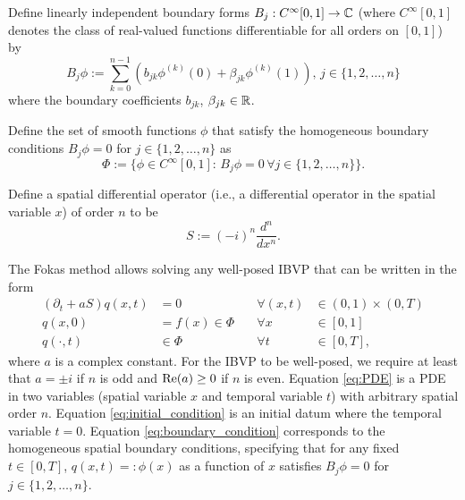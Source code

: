 \documentclass[12pt, oneside, a4paper]{article}
\begin{document}
Define linearly independent boundary forms $B_j: C^\infty[0,1]\to \mathbb C$ (where $C^\infty[0,1]$ denotes the class of real-valued functions differentiable for all orders on $[0,1]$) by
\begin{equation}\label{eq:B_j}
    B_j\phi := \sum_{k=0}^{n-1}\left(b_{jk}\phi^{(k)}(0) + \beta_{jk}\phi^{(k)}(1)\right),\, j\in\{1,2,\ldots,n\}
\end{equation}
where the boundary coefficients $b_{jk}$, $\beta_{jk}\in\mathbb R$. 

Define the set of smooth functions $\phi$ that satisfy the homogeneous boundary conditions $B_j\phi=0$ for $j\in\{1,2,\ldots,n\}$ as
\begin{equation}\label{eq:Phi}
    \Phi:=\{\phi\in C^\infty[0,1]:\, B_j\phi = 0\,\forall j\in\{1,2,\ldots,n\}\}.
\end{equation}

Define a spatial differential operator (i.e., a differential operator in the spatial variable $x$) of order $n$ to be
\begin{equation}\label{eq:S}
    S := (-i)^n \frac{d^n}{dx^n}.
\end{equation}

The Fokas method allows solving any well-posed IBVP that can be written in the form
\begin{subequations}\label{eq:IBVP}
    \begin{alignat}{3}
        (\partial_t + aS)q(x,t) &= 0\quad &\forall (x,t)&\in (0,1)\times (0,T) \label{eq:PDE}\\
        q(x,0) &= f(x)\in \Phi\quad &\forall x&\in [0,1]\label{eq:initial_condition}\\
        q(\cdot, t) &\in \Phi \quad &\forall t&\in [0,T],\label{eq:boundary_condition}
    \end{alignat}
\end{subequations}
where $a$ is a complex constant. For the IBVP to be well-posed, we require at least that $a=\pm i$ if $n$ is odd and $\mathrm{Re}(a)\geq 0$ if $n$ is even. Equation \eqref{eq:PDE} is a PDE in two variables (spatial variable $x$ and temporal variable $t$) with arbitrary spatial order $n$.
Equation \eqref{eq:initial_condition} is an initial datum where the temporal variable $t=0$. Equation \eqref{eq:boundary_condition} corresponds to the homogeneous spatial boundary conditions, specifying that for any fixed $t\in [0,T]$, $q(x,t)=:\phi(x)$ as a function of $x$ satisfies $B_j\phi=0$ for $j\in \{1,2,\ldots,n\}$.
\end{document}
